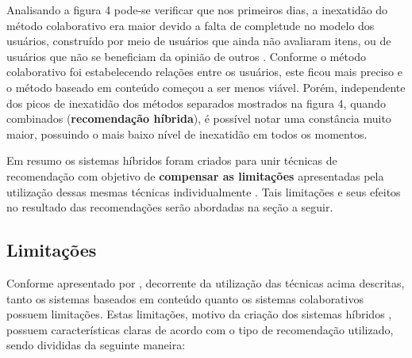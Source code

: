 \documentclass[12pt, openright, oneside, a4paper, brazil]{abntex2}
\begin{document}
Analisando a figura 4 pode-se verificar que nos primeiros dias, a inexatidão do método colaborativo era maior devido a falta de completude no modelo dos usuários, construído por meio de usuários que ainda não avaliaram itens, ou de usuários que não se beneficiam da opinião de outros \cite{claypool1999combining}. Conforme o método colaborativo foi estabelecendo relações entre os usuários, este ficou mais preciso e o método baseado em conteúdo começou a ser menos viável. Porém, independente dos picos de inexatidão dos métodos separados mostrados na figura 4, quando combinados (\textbf{recomendação híbrida}), é possível notar uma constância muito maior, possuindo o mais baixo nível de inexatidão em todos os momentos.

Em resumo os sistemas híbridos foram criados para unir técnicas de recomendação com objetivo de \textbf{compensar as limitações} apresentadas pela utilização dessas mesmas técnicas individualmente \cite{balabanovic1997fab}. Tais limitações e seus efeitos no resultado das recomendações serão abordadas na seção a seguir.

\subsection{Limitações}

Conforme apresentado por , decorrente da utilização das técnicas acima descritas, tanto os sistemas baseados em conteúdo quanto os sistemas colaborativos possuem limitações. Estas limitações, motivo da criação dos sistemas híbridos \cite{balabanovic1997fab}, possuem características claras de acordo com o tipo de recomendação utilizado, sendo divididas da seguinte maneira:
\end{document}
